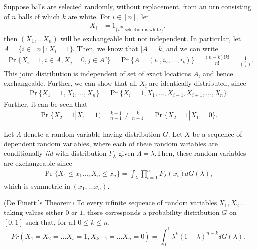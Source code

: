 \documentclass[a4paper,10pt,english]{article}
\begin{document}
\begin{exmp}
Suppose balls are selected randomly, without replacement, from an urn consisting of $n$ balls of which $k$ are white. For $i \in [n]$, let
\begin{align*}
   X_i &= 1_{\{ i^{\text{th}}\text{ selection is white}\}},
\end{align*}
then $(X_1, \ldots X_n)$ will be exchangeable but not independent.  
In particular, let $A = \{ i \in [n]: X_i = 1\}$. Then, we know that $|A| = k$, and we can write 
\begin{align*}
\Pr\{X_i = 1, i \in A, X_j = 0, j \in A^c\} = \Pr\{A = (i_1, i_2, \ldots, i_k) \} = \frac{(n-k)!k!}{n!} = \frac{1}{\binom{n}{k}}.
\end{align*}
This joint distribution is independent of set of exact locations $A$, and hence exchangeable. 
Further, we can show that all $X_i$ are identically distributed, since
\begin{align*}
\Pr\{X_1= 1, X_2, \ldots, X_n\} = \Pr\{X_i = 1, X_1, \ldots, X_{i-1}, X_{i+1}, \ldots, X_n\}. 
\end{align*}
Further, it can be seen that
\begin{align*}
\Pr\{X_2 = 1|X_1= 1) = \frac{k-1}{n-1} \neq \frac{k}{n-1} = \Pr\{X_2 = 1|X_1 =0\}.
\end{align*}
\end{exmp}
\begin{exmp}
Let $\Lambda$ denote a random variable having distribution $G$. Let $X$ be a sequence of dependent random variables, where each of these random variables are conditionally \textit{iid} with distribution $F_\lambda$ given $\Lambda= \lambda$.Then, these random variables are exchangeable since
\begin{align*}
\Pr\{X_1 \leq x_1 \ldots , X_n \leq x_n\} = \int_{\lambda} \prod_{i=1}^nF_\lambda(x_i)dG(\lambda),
\end{align*}
which is symmetric in $(x_1, \ldots x_n)$. %
\end{exmp}
\begin{thm}
(De Finetti's Theorem) To every infinite sequence of random variables $X_1, X_2 \hdots $ taking values either $0$ or $1$, there corresponds a probability distribution $G$ on $[0,1]$ such that, for all $0 \leq k \leq n$,
\begin{equation*}
\label{De Finetti}
Pr(X_1=X_2= \hdots X_k =1, X_{k+1}= \hdots X_n = 0)= \int_{0}^{1}\lambda^k(1-\lambda)^{n-k}dG(\lambda).
\end{equation*}  
\end{thm}
\end{document}
